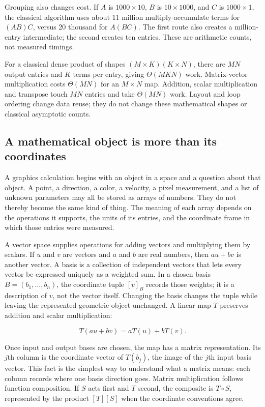 Grouping also changes cost. If \(A\) is \(1000\times10\), \(B\) is \(10\times1000\), and \(C\) is \(1000\times1\), the classical algorithm uses about 11 million multiply-accumulate terms for \((AB)C\), versus 20 thousand for \(A(BC)\). The first route also creates a million-entry intermediate; the second creates ten entries. These are arithmetic counts, not measured timings.

For a classical dense product of shapes \((M\times K)(K\times N)\), there are \(MN\) output entries and \(K\) terms per entry, giving \(\Theta(MKN)\) work. Matrix-vector multiplication costs \(\Theta(MN)\) for an \(M\times N\) map. Addition, scalar multiplication and transpose touch \(MN\) entries and take \(\Theta(MN)\) work. Layout and loop ordering change data reuse; they do not change these mathematical shapes or classical asymptotic counts.

\subsection{A mathematical object is more than its coordinates}\label{01-foundations-i-ch018-a-mathematical-object-is-more-than-its-coordinates}

A graphics calculation begins with an object in a space and a question about that object. A point, a direction, a color, a velocity, a pixel measurement, and a list of unknown parameters may all be stored as arrays of numbers. They do not thereby become the same kind of thing. The meaning of each array depends on the operations it supports, the units of its entries, and the coordinate frame in which those entries were measured.

A vector space supplies operations for adding vectors and multiplying them by scalars. If \(u\) and \(v\) are vectors and \(a\) and \(b\) are real numbers, then \(au+bv\) is another vector. A basis is a collection of independent vectors that lets every vector be expressed uniquely as a weighted sum. In a chosen basis \(B=(b_1,\ldots,b_n)\), the coordinate tuple \([v]_B\) records those weights; it is a description of \(v\), not the vector itself. Changing the basis changes the tuple while leaving the represented geometric object unchanged. A linear map \(T\) preserves addition and scalar multiplication:

\[
T(au+bv)=aT(u)+bT(v).
\]

Once input and output bases are chosen, the map has a matrix representation. Its \(j\)th column is the coordinate vector of \(T(b_j)\), the image of the \(j\)th input basis vector. This fact is the simplest way to understand what a matrix means: each column records where one basis direction goes. Matrix multiplication follows function composition. If \(S\) acts first and \(T\) second, the composite is \(T\circ S\), represented by the product \([T][S]\) when the coordinate conventions agree.

